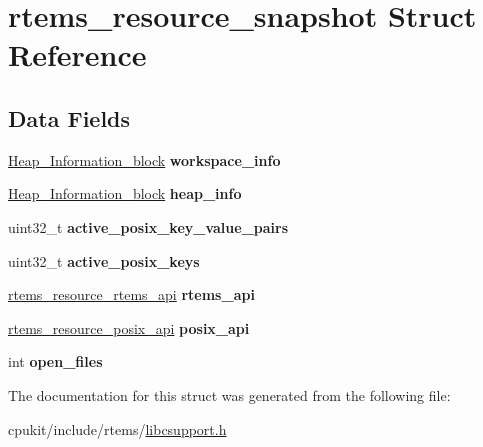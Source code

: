 \hypertarget{structrtems__resource__snapshot}{}\section{rtems\+\_\+resource\+\_\+snapshot Struct Reference}
\label{structrtems__resource__snapshot}
\subsection*{Data Fields}
\begin{DoxyCompactItemize}
\item 
\mbox{\label{structrtems__resource__snapshot_a125b40b7f06733222b9b33200f5c8bfa}} 
\mbox{\hyperlink{structHeap__Information__block}{Heap\+\_\+\+Information\+\_\+block}} {\bfseries workspace\+\_\+info}
\item 
\mbox{\label{structrtems__resource__snapshot_a38e1beb42f07f9a9d93d938b84d700fd}} 
\mbox{\hyperlink{structHeap__Information__block}{Heap\+\_\+\+Information\+\_\+block}} {\bfseries heap\+\_\+info}
\item 
\mbox{\label{structrtems__resource__snapshot_aa38cb0a0e90a69e25f9ed6ca1c770767}} 
uint32\+\_\+t {\bfseries active\+\_\+posix\+\_\+key\+\_\+value\+\_\+pairs}
\item 
\mbox{\label{structrtems__resource__snapshot_ad99502b0ef96887a964845b9ddc5a17e}} 
uint32\+\_\+t {\bfseries active\+\_\+posix\+\_\+keys}
\item 
\mbox{\label{structrtems__resource__snapshot_a8a8f9808806859dc0106d1dc0bfff0e2}} 
\mbox{\hyperlink{structrtems__resource__rtems__api}{rtems\+\_\+resource\+\_\+rtems\+\_\+api}} {\bfseries rtems\+\_\+api}
\item 
\mbox{\label{structrtems__resource__snapshot_a3f6dcc5c4e8ac766f4e6e5ed1de4040f}} 
\mbox{\hyperlink{structrtems__resource__posix__api}{rtems\+\_\+resource\+\_\+posix\+\_\+api}} {\bfseries posix\+\_\+api}
\item 
\mbox{\label{structrtems__resource__snapshot_a73e18ded113f501d7334ec6f949f4bb9}} 
int {\bfseries open\+\_\+files}
\end{DoxyCompactItemize}


The documentation for this struct was generated from the following file\+:\begin{DoxyCompactItemize}
\item 
cpukit/include/rtems/\mbox{\hyperlink{libcsupport_8h}{libcsupport.\+h}}\end{DoxyCompactItemize}
